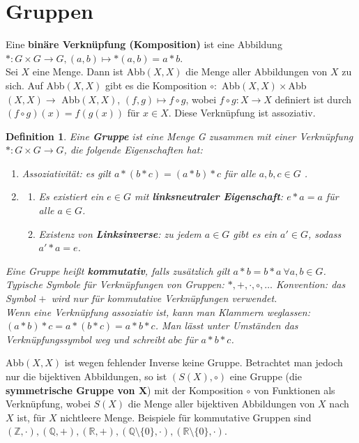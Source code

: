 \documentclass[12pt,a4paper]{article}
\theoremstyle{plain}
\newtheorem{Definition}[Theorem]{Definition}
\newcommand{\herv}[1]{{\emph{\textbf{#1}}}}
\newcommand{\R}{\mathbb{R}}
\newcommand{\Z}{\mathbb{Z}}
\newcommand{\Q}{\mathbb{Q}}
\numberwithin{equation}{section}
\begin{document}
\section{Gruppen}
Eine \textbf{binäre Verknüpfung (Komposition)} ist eine Abbildung $*:G\times G \rightarrow G, (a,b)\mapsto *(a,b)=a*b$.\\
Sei $X$ eine Menge. Dann ist Abb$(X,X)$ die Menge aller Abbildungen von $X$ zu sich. Auf Abb$(X,X)$ gibt es die Komposition $\circ:$ Abb$(X,X)\times$Abb$(X,X) \rightarrow $ Abb$(X,X)$, $(f,g)\mapsto f\circ g$, wobei $f\circ g: X\rightarrow X$ definiert ist durch $(f\circ g)(x)=f(g(x))$ für $x\in X$. Diese Verknüpfung ist assoziativ.
\begin{Definition}
Eine \herv{Gruppe} ist eine Menge G zusammen mit einer Verknüpfung $*:G\times G \rightarrow G$, die folgende Eigenschaften hat:
\begin{enumerate}
\renewcommand{\labelenumi}{\emph{\underline{G\arabic{enumi}}}}
\item Assoziativität: es gilt $a*(b*c)=(a*b)*c$ für alle $a,b,c\in G$ .
\item \begin{enumerate} \renewcommand{\labelenumi}{\emph{(\alph{enumi})}}
\item Es existiert ein $e\in G$ mit \herv{linksneutraler Eigenschaft}: $e*a=a$ für alle $a\in G$.
\item Existenz von \herv{Linksinverse}: zu jedem $a\in G$ gibt es ein $a'\in G$, sodass $a'*a=e$.
\end{enumerate}
\end{enumerate}
Eine Gruppe heißt \herv{kommutativ}, falls zusätzlich gilt $a*b=b*a\ \forall a,b\in G$. Typische Symbole für Verknüpfungen von Gruppen: $*,+,\cdot,\circ,\ldots$ Konvention: das Symbol \glqq$+$\grqq\ wird nur für kommutative Verknüpfungen verwendet. \\
Wenn eine Verknüpfung assoziativ ist, kann man Klammern weglassen: $(a*b)*c=a*(b*c)=a*b*c$. Man lässt unter Umständen das Verknüpfungssymbol weg und schreibt $abc$ für $a*b*c$.
\end{Definition}
Abb$(X,X)$ ist wegen fehlender Inverse keine Gruppe. Betrachtet man jedoch nur die bijektiven Abbildungen, so ist $(S(X),\circ)$ eine Gruppe (die \textbf{symmetrische Gruppe von $\mathbf{X}$}) mit der Komposition $\circ$ von Funktionen als Verknüpfung, wobei $S(X)$ die Menge aller bijektiven Abbildungen von $X$ nach $X$ ist, für $X$ nichtleere Menge. Beispiele für kommutative Gruppen sind $(\Z,\cdot), (\Q,+), (\R,+), (\Q\setminus\{0\},\cdot),(\R\setminus\{0\},\cdot)$.
\end{document}
